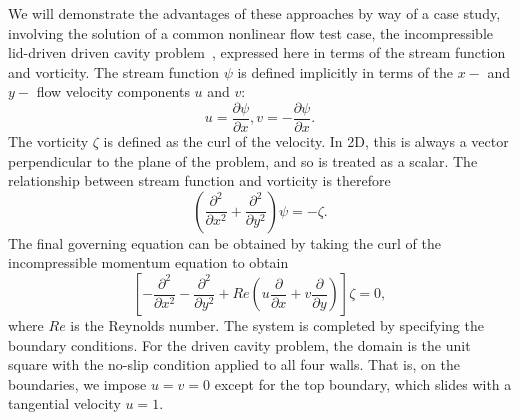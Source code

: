 \documentclass[acmtocl]{acmtrans2m}
\begin{document}
We will demonstrate the advantages of these approaches by way of a
case study, involving the solution of a common nonlinear flow test
case, the incompressible lid-driven driven cavity problem~\cite{Ghia},
expressed here in terms of the stream function and vorticity.  The
stream function $\psi$ is defined implicitly in terms of the $x-$ and
$y-$ flow velocity components $u$ and $v$:
\begin{equation}
  \label{eq:velocities}
  u = \frac{\partial \psi}{\partial x}, v = -\frac{\partial
    \psi}{\partial x}.
\end{equation}
The vorticity $\zeta$ is defined as the curl of the velocity.  In 2D,
this is always a vector perpendicular to the plane of the problem, and
so is treated as a scalar.  The relationship between stream function
and vorticity is therefore
\begin{equation}
  \label{eq:streamfunction}
  \left(\frac{\partial^2}{\partial x^2} + \frac{\partial^2}{\partial
    y^2}\right) \psi = -\zeta.
\end{equation}
The final governing equation can be obtained by taking the curl of the
incompressible momentum equation to obtain
\begin{equation}
  \label{eq:vorticity}
  \left[-\frac{\partial^2}{\partial x^2} - \frac{\partial^2}{\partial
    y^2} + Re \left(u \frac{\partial}{\partial x} + v
  \frac{\partial}{\partial y} \right)\right] \zeta = 0,
\end{equation}
where $Re$ is the Reynolds number.  The system is completed by
specifying the boundary conditions.  For the driven cavity problem,
the domain is the unit square with the no-slip condition applied to
all four walls.  That is, on the boundaries, we impose $u=v=0$ except
for the top boundary, which slides with a tangential velocity $u=1$.
\end{document}
